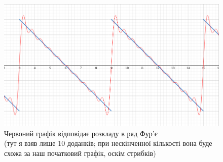 \documentclass[a4paper, 10pt]{article}
\def\hugespace{\vspace{5mm} \\}
\theoremstyle{theoremdd}
\theoremstyle{theoremdd}
\theoremstyle{theoremdd}
\theoremstyle{theoremdd}
\theoremstyle{theoremdd}
\theoremstyle{theoremdd}
\theoremstyle{theoremdd}
\theoremstyle{theoremdd}
\begin{document}
	\begin{figure}[h]
	\captionsetup{justification=centering}
	\centerline{\includegraphics[scale = 0.6]{FourierExpansion.png}}	
	\caption{Червоний графік відповідає розкладу в ряд Фур'є \\ (тут я взяв лише 10 доданків; при нескінченної кількості вона буде схожа за наш початковий графік, оскім стрибків)}
	\end{figure}
\hugespace
\end{document}
